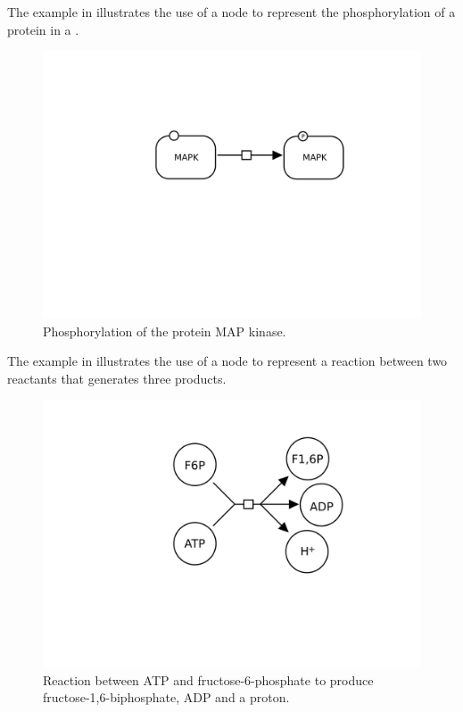 The example in  illustrates the use of a  node to represent the phosphorylation of a protein in a \PD.

\begin{figure}[htb]
  \centering
  \includegraphics[scale = 0.3]{examples/process-phosphorylation}
  \caption{Phosphorylation of the protein MAP kinase.}
  \label{fig:techref:trans-phos}
\end{figure}

The example in  illustrates the use of a  node to represent a reaction between two reactants that generates three products.

\begin{figure}[htb]
  \centering
  \includegraphics[scale = 0.3]{examples/process-reaction}
  \caption{Reaction between ATP and fructose-6-phosphate to produce fructose-1,6-biphosphate, ADP and a proton.}
  \label{fig:techref:trans-react}
\end{figure}

